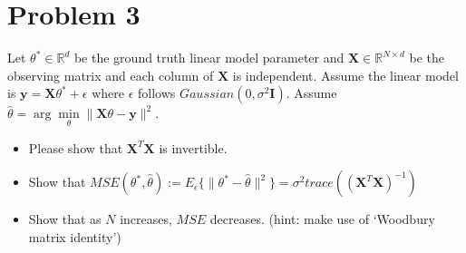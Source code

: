 \documentclass[11pt]{article}
\newcommand{\R}{\mathbb{R}}
\newcommand{\mtx}[1]{\mathbf{#1}}
\newcommand{\vct}[1]{\mathbf{#1}}
\def \mI {\mtx{I}}
\def \mX {\mtx{X}}
\def \vy {\vct{y}}
\def \R {\mathbb{R}}
\begin{document}
	\section*{Problem 3}
	Let $\theta^*\in\R^d$ be the ground truth linear model parameter and $\mX\in\R^{N\times d}$ be the observing matrix and each column of $\mX$ is independent. Assume the linear model is $\vy=\mX\theta^*+\epsilon$ where $\epsilon$ follows $Gaussian(0,\sigma^2\mI)$. Assume $\hat{\theta}=\arg\min\limits_\theta \|\mX\theta-\vy\|^2$.
	\begin{itemize}
		\item Please show that $\mX^T\mX$ is invertible.
		\item Show that $MSE(\theta^*,\hat{\theta}):=E_\epsilon \{\|\theta^*-\hat{\theta}\|^2\}=\sigma^2 trace((\mX^T\mX)^{-1})$
		\item Show that as $N$ increases, $MSE$ decreases. (hint: make use of `Woodbury matrix identity')
	\end{itemize} 
\end{document}
